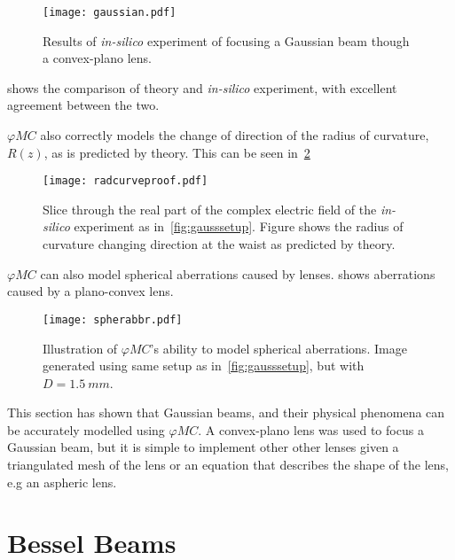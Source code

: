\begin{figure}[!htpb]
    \centering
    \texttt{[image: gaussian.pdf]}
    \caption{Results of \textit{in-silico} experiment of focusing a Gaussian beam though a convex-plano lens.}
    \label{fig:simgaussexp}
\end{figure}


 shows the comparison of theory and \textit{in-silico} experiment, with excellent agreement between the two.

$\varphi MC$ also correctly models the change of direction of the radius of curvature, $R(z)$, as is predicted by theory.
This can be seen in~\cref{fig:proofchgrz}

\begin{figure}[!htpb]
    \centering
    \texttt{[image: radcurveproof.pdf]}
    \caption{Slice through the real part of the complex electric field of the \textit{in-silico} experiment as in~\cref{fig:gausssetup}. Figure shows the radius of curvature changing direction at the waist as predicted by theory.}
    \label{fig:proofchgrz}
\end{figure}

$\varphi MC$ can also model spherical aberrations caused by lenses.
 shows aberrations caused by a plano-convex lens.

\begin{figure}[!hbtp]
    \centering
    \texttt{[image: spherabbr.pdf]}
    \caption{Illustration of $\varphi MC$'s ability to model spherical aberrations. Image generated using same setup as in~\cref{fig:gausssetup}, but with $D=1.5~mm$.}
    \label{fig:spheraberr}
\end{figure}


This section has shown that Gaussian beams, and their physical phenomena can be accurately modelled using $\varphi MC$.
A convex-plano lens was used to focus a Gaussian beam, but it is simple to implement other other lenses given a triangulated mesh of the lens or an equation that describes the shape of the lens, e.g an aspheric lens.
\FloatBarrier

\section{Bessel Beams}

